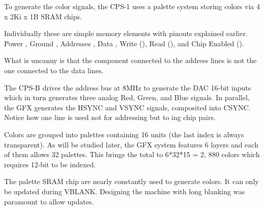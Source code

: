 To generate the color signals, the CPS-1 uses a palette system storing colors via 4 x 2Ki x 1B  SRAM chips.


Individually these are simple memory elements with pinouts explained earlier. Power , Ground , Addresses , Data , Write (), Read (), and Chip Enabled ().

What is uncanny is that the component connected to the address lines is not the one connected to the data lines.







The CPS-B drives the address bus at 8MHz to generate the DAC 16-bit inputs which in turn generates three analog Red, Green, and Blue signals. In parallel, the GFX generates the HSYNC and VSYNC signals, composited into CSYNC.
Notice how one line is used not for addressing but to ing chip pairs. 

Colors are grouped into palettes containing 16 units (the last index is always transparent). As will be studied later, the GFX system features 6 layers and each of them allows 32 palettes. This brings the total to 6*32*15 = 2, 880 colors which requires 12-bit to be indexed.


 The palette SRAM chip are nearly constantly used to generate colors. It can only be updated during VBLANK. Designing the machine with long blanking was paramount to allow updates. 



 




\pagebreak




